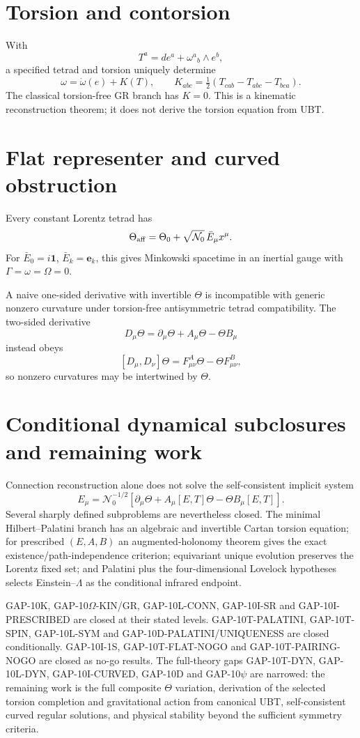 \documentclass[11pt,a4paper]{article}
\begin{document}
\section{Torsion and contorsion}
With
\[
 T^a=de^a+\omega^a{}_b\wedge e^b,
\]
a specified tetrad and torsion uniquely determine
\[
 \boxed{\omega=\mathring\omega(e)+K(T)},
 \qquad
 K_{abc}=\tfrac12(T_{cab}-T_{abc}-T_{bca}).
\]
The classical torsion-free GR branch has $K=0$.  This is a kinematic
reconstruction theorem; it does not derive the torsion equation from UBT.

\section{Flat representer and curved obstruction}
Every constant Lorentz tetrad has
\[
 \Theta_{\rm aff}=\Theta_0+\sqrt{\mathcal N_0}\,\bar E_\mu x^\mu.
\]
For $\bar E_0=i\mathbf1$, $\bar E_k=\mathbf e_k$, this gives Minkowski
spacetime in an inertial gauge with $\Gamma=\omega=\Omega=0$.

A naive one-sided derivative with invertible $\Theta$ is incompatible with
generic nonzero curvature under torsion-free antisymmetric tetrad
compatibility.  The two-sided derivative
\[
 D_\mu\Theta=\partial_\mu\Theta+A_\mu\Theta-\Theta B_\mu
\]
instead obeys
\[
 [D_\mu,D_\nu]\Theta
 =F^A_{\mu\nu}\Theta-\Theta F^B_{\mu\nu},
\]
so nonzero curvatures may be intertwined by $\Theta$.

\section{Conditional dynamical subclosures and remaining work}
Connection reconstruction alone does not solve the self-consistent implicit system
\[
 E_\mu=\mathcal N_0^{-1/2}
 [\partial_\mu\Theta+A_\mu[E,T]\Theta-\Theta B_\mu[E,T]].
\]
Several sharply defined subproblems are nevertheless closed.  The minimal
Hilbert--Palatini branch has an algebraic and invertible Cartan torsion equation;
for prescribed $(E,A,B)$ an augmented-holonomy theorem gives the exact
existence/path-independence criterion; equivariant unique evolution preserves
the Lorentz fixed set; and Palatini plus the four-dimensional Lovelock
hypotheses selects Einstein--$\Lambda$ as the conditional infrared endpoint.

\begin{tcolorbox}[colback=yellow!6!white,colframe=orange!65!black,title=Status]
GAP-10K, GAP-10$\Omega$-KIN/GR, GAP-10L-CONN, GAP-10I-SR and
GAP-10I-PRESCRIBED are closed at their stated levels.  GAP-10T-PALATINI,
GAP-10T-SPIN, GAP-10L-SYM and GAP-10D-PALATINI/UNIQUENESS are closed
conditionally.  GAP-10I-1S, GAP-10T-FLAT-NOGO and
GAP-10T-PAIRING-NOGO are closed as no-go results.  The full-theory gaps
GAP-10T-DYN, GAP-10L-DYN, GAP-10I-CURVED, GAP-10D and GAP-10$\psi$ are
narrowed: the remaining work is the full composite $\Theta$ variation,
derivation of the selected torsion completion and gravitational action from
canonical UBT, self-consistent curved regular solutions, and physical
stability beyond the sufficient symmetry criteria.
\end{tcolorbox}
\end{document}
